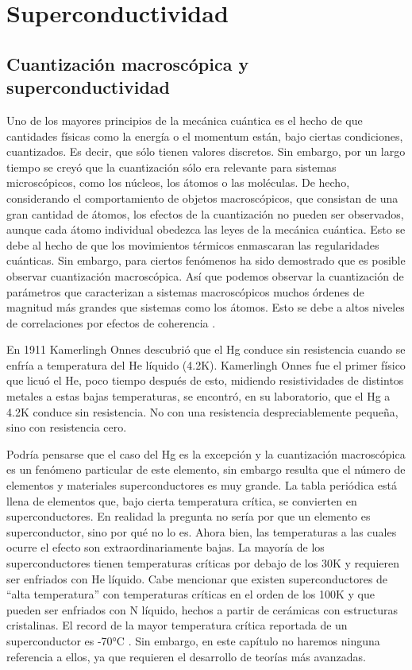 \chapter{Superconductividad}

\section{Cuantización macroscópica y superconductividad}

Uno de los mayores principios de la mecánica cuántica es el hecho de que cantidades físicas como la energía o el momentum están, bajo ciertas condiciones, cuantizados. Es decir, que sólo tienen valores discretos. Sin embargo, por un largo tiempo se creyó que la cuantización sólo era relevante para sistemas microscópicos, como los núcleos, los átomos o las moléculas. De hecho, considerando el comportamiento de objetos macroscópicos, que consistan de una gran cantidad de átomos, los efectos de la cuantización no pueden ser observados, aunque cada átomo individual obedezca las leyes de la mecánica cuántica. Esto se debe al hecho de que los movimientos térmicos enmascaran las regularidades cuánticas. Sin embargo, para ciertos fenómenos ha sido demostrado que es posible observar cuantización macroscópica. Así que podemos observar la cuantización de parámetros que caracterizan a sistemas macroscópicos muchos órdenes de magnitud más grandes que sistemas como los átomos. Esto se debe a altos niveles de correlaciones por efectos de coherencia \cite{gross}.

En 1911 Kamerlingh Onnes \cite{onnes} descubrió que el Hg conduce sin resistencia cuando se enfría a temperatura del He líquido (4.2K). Kamerlingh Onnes fue el primer físico que licuó el He, poco tiempo después de esto, midiendo resistividades de distintos metales a estas bajas temperaturas, se encontró, en su laboratorio, que el Hg a 4.2K conduce sin resistencia. No con una resistencia despreciablemente pequeña, sino con resistencia cero.

Podría pensarse que el caso del Hg es la excepción y la cuantización macroscópica es un fenómeno particular de este elemento, sin embargo resulta que el número de elementos y materiales superconductores es muy grande. La tabla periódica está llena de elementos que, bajo cierta temperatura crítica, se convierten en superconductores. En realidad la pregunta no sería por que un elemento es superconductor, sino por qué no lo es. Ahora bien, las temperaturas a las cuales ocurre el efecto son extraordinariamente bajas. La mayoría de los superconductores tienen temperaturas críticas por debajo de los 30K y requieren ser enfriados con He líquido. Cabe mencionar que existen superconductores de ``alta temperatura'' con temperaturas críticas en el orden de los 100K y que pueden ser enfriados con N líquido, hechos a partir de cerámicas con estructuras cristalinas. El record de la mayor temperatura crítica reportada de un superconductor es -70°C \cite{drozdov}. Sin embargo, en este capítulo no haremos ninguna referencia a ellos, ya que requieren el desarrollo de teorías más avanzadas.


